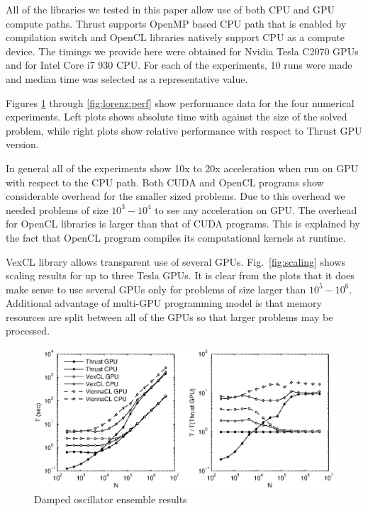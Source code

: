 \documentclass[1p]{elsarticle}
\newcommand{\figref}[1]{Fig.~\ref{#1}}
\begin{document}
All of the libraries we tested in this paper allow use of both CPU and GPU
compute paths. Thrust supports OpenMP based CPU path that is enabled by
compilation switch and OpenCL libraries natively support CPU as a compute
device.  The timings we provide here were obtained for Nvidia Tesla C2070 GPUs
and for Intel Core i7 930 CPU. For each of the experiments, 10 runs were made
and median time was selected as a representative value.

Figures \ref{fig:damped:perf} through \ref{fig:lorenz:perf} show performance
data for the four numerical experiments. Left plots shows absolute time with
against the size of the solved problem, while right plots show relative
performance with respect to Thrust GPU version.

In general all of the experiments show 10x to 20x acceleration when run on GPU
with respect to the CPU path. Both CUDA and OpenCL programs show considerable
overhead for the smaller sized problems. Due to this overhead we needed
problems of size $10^3-10^4$ to see any acceleration on GPU. The overhead for
OpenCL libraries is larger than that of CUDA programs. This is explained by the
fact that OpenCL program compiles its computational kernels at runtime.

VexCL library allows transparent use of several GPUs. \figref{fig:scaling}
shows scaling results for up to three Tesla GPUs. It is clear from the plots
that it does make sense to use several GPUs only for problems of size larger
than $10^5-10^6$. Additional advantage of multi-GPU programming model is that
memory resources are split between all of the GPUs so that larger problems may
be processed.

\begin{figure}[p]
    \begin{center}
        \includegraphics[width=\textwidth]{data/damped_oscillator/perfcmp}
    \end{center}
    \caption{Damped oscillator ensemble results}
    \label{fig:damped:perf}
\end{figure}
\end{document}
